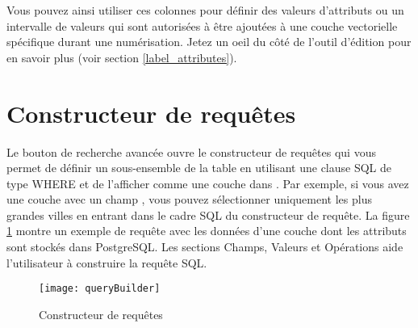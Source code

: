 Vous pouvez ainsi utiliser ces colonnes pour définir des valeurs d'attributs ou 
un intervalle de valeurs qui sont autorisées à être ajoutées à une couche 
vectorielle spécifique durant une numérisation. Jetez un oeil du côté de l'outil 
d'édition pour en savoir plus (voir section \ref{label_attributes}).

\section{Constructeur de requêtes}\label{sec:query_builder}


Le bouton de recherche avancée ouvre le constructeur de requêtes qui vous permet 
de définir un sous-ensemble de la table en utilisant une clause SQL de type 
WHERE et de l'afficher comme une couche dans \qg. Par exemple, si vous avez une 
couche  avec un champ , vous pouvez 
sélectionner uniquement les plus grandes villes en entrant  dans le cadre SQL du constructeur de requête. La figure 
\ref{fig:query_builder} montre un exemple de requête avec les données d'une
couche \pg dont les attributs sont stockés dans PostgreSQL. Les sections Champs, 
 Valeurs et Opérations aide l'utilisateur à construire la requête SQL. 

\begin{figure}[ht]
  \begin{center}
    \texttt{[image: queryBuilder]}
    \caption{Constructeur de requêtes \nixcaption} \label{fig:query_builder}
  \end{center}
\end{figure}

